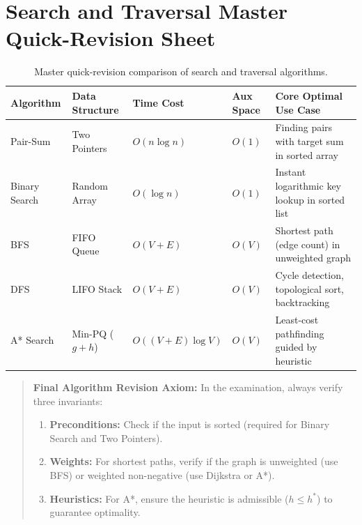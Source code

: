 \section{Search and Traversal Master Quick-Revision Sheet}

\begin{table}[htbp]
\centering
\small
\begin{tabularx}{\textwidth}{p{3.2cm} p{2.2cm} p{2.2cm} p{2.2cm} X}
\toprule
\textbf{Algorithm} & \textbf{Data Structure} & \textbf{Time Cost} & \textbf{Aux Space} & \textbf{Core Optimal Use Case} \\
\midrule
Pair-Sum & Two Pointers & $O(n \log n)$ & $O(1)$ & Finding pairs with target sum in sorted array \\
Binary Search & Random Array & $O(\log n)$ & $O(1)$ & Instant logarithmic key lookup in sorted list \\
BFS & FIFO Queue & $O(V + E)$ & $O(V)$ & Shortest path (edge count) in unweighted graph \\
DFS & LIFO Stack & $O(V + E)$ & $O(V)$ & Cycle detection, topological sort, backtracking \\
A* Search & Min-PQ ($g+h$) & $O((V+E)\log V)$ & $O(V)$ & Least-cost pathfinding guided by heuristic \\
\bottomrule
\end{tabularx}
\caption{Master quick-revision comparison of search and traversal algorithms.}
\end{table}

\begin{quote}
\textbf{Final Algorithm Revision Axiom:} In the examination, always verify three invariants:
\begin{enumerate}
    \item \textbf{Preconditions:} Check if the input is sorted (required for Binary Search and Two Pointers).
    \item \textbf{Weights:} For shortest paths, verify if the graph is unweighted (use BFS) or weighted non-negative (use Dijkstra or A*).
    \item \textbf{Heuristics:} For A*, ensure the heuristic is admissible ($h \leq h^*$) to guarantee optimality.
\end{enumerate}
\end{quote}
